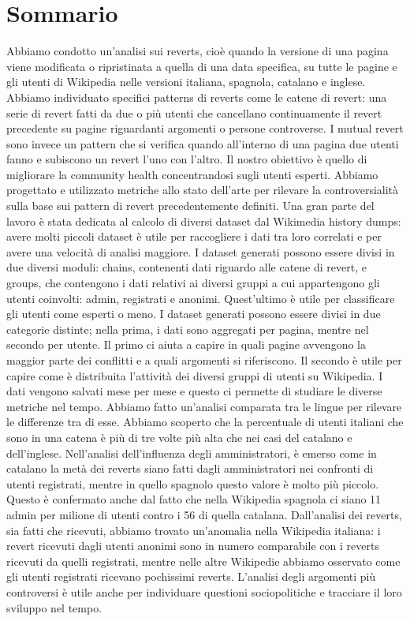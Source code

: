 \clearpage
\chapter*{Sommario} 

Abbiamo condotto un'analisi sui reverts, cioè quando la versione di una pagina viene modificata o
ripristinata a quella di una data specifica, su tutte le pagine e gli utenti di Wikipedia nelle
versioni italiana, spagnola, catalano e inglese. Abbiamo individuato specifici patterns di reverts
come le catene di revert: una serie di revert fatti da due o più utenti che cancellano continuamente
il revert precedente su pagine riguardanti argomenti o persone controverse. I mutual revert sono
invece un pattern che si verifica quando all'interno di una pagina due utenti fanno e subiscono un
revert l'uno con l'altro. Il nostro obiettivo è quello di migliorare la community health
concentrandosi sugli utenti esperti. Abbiamo progettato e utilizzato metriche allo stato dell'arte
per rilevare la controversialità sulla base sui pattern di revert precedentemente definiti. Una gran
parte del lavoro è stata dedicata al calcolo di diversi dataset dal Wikimedia history dumps: avere
molti piccoli dataset è utile per raccogliere i dati tra loro correlati e per avere una velocità di
analisi maggiore. I dataset generati possono essere divisi in due diversi moduli: chains, contenenti
dati riguardo alle catene di revert, e groups, che contengono i dati relativi ai diversi gruppi a
cui appartengono gli utenti coinvolti: admin, registrati e anonimi. Quest'ultimo è utile per
classificare gli utenti come esperti o meno. I dataset generati possono essere divisi in due
categorie distinte; nella prima, i dati sono aggregati per pagina, mentre nel secondo per utente. Il
primo ci aiuta a capire in quali pagine avvengono la maggior parte dei conflitti e a quali argomenti
si riferiscono. Il secondo è utile per capire come è distribuita l'attività dei diversi gruppi di
utenti su Wikipedia. I dati vengono salvati mese per mese e questo ci permette di studiare le
diverse metriche nel tempo. Abbiamo fatto un'analisi comparata tra le lingue per rilevare le
differenze tra di esse. Abbiamo scoperto che la percentuale di utenti italiani che sono in una
catena è più di tre volte più alta che nei casi del catalano e dell'inglese. Nell'analisi
dell'influenza degli amministratori, è emerso come in catalano la metà dei reverts siano fatti dagli
amministratori nei confronti di utenti registrati, mentre in quello spagnolo questo valore è molto più
piccolo. Questo è confermato anche dal fatto che nella Wikipedia spagnola ci siano 11 admin per
milione di utenti contro i 56 di quella catalana. Dall'analisi dei reverts, sia fatti che ricevuti,
abbiamo trovato un'anomalia nella Wikipedia italiana: i revert ricevuti dagli utenti anonimi sono
in numero comparabile con i reverts ricevuti da quelli registrati, mentre nelle altre Wikipedie abbiamo
osservato come gli utenti registrati ricevano pochissimi reverts. L'analisi degli argomenti più
controversi è utile anche per individuare questioni sociopolitiche e tracciare il loro sviluppo nel
tempo. 


